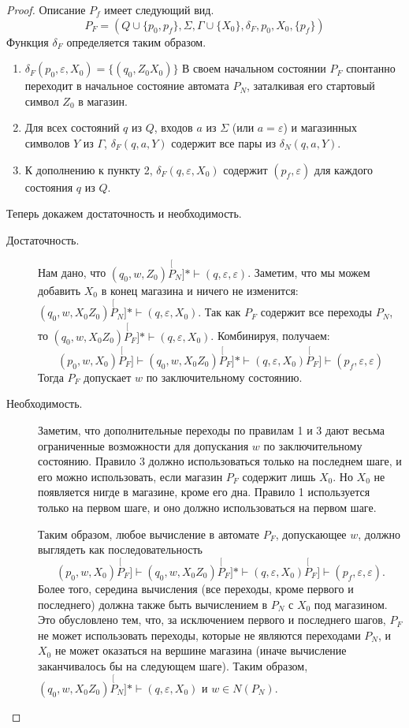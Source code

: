 \documentclass[a4paper,12pt]{article}
\begin{document}
\begin{proof}
	Описание \(P_f\) имеет следующий вид.
	\[P_F = \left(Q \cup \{p_0, p_f\}, \Sigma, \Gamma \cup \{X_0\}, \delta_F, p_0, X_0, \{p_f\}\right)\]
Функция \(\delta_F\) определяется таким образом.
\begin{enumerate}
	\item \(\delta_F(p_0, \varepsilon, X_0) = \{(q_0, Z_0X_0)\}\) В своем начальном состоянии \(P_F\) спонтанно переходит в
	начальное состояние автомата \(P_N\), заталкивая его стартовый символ \(Z_0\) в магазин.
	\item Для всех состояний \(q\) из \(Q\), входов \(a\) из \(\Sigma\) (или \(a = \varepsilon\)) и магазинных символов \(Y\) из \(\Gamma\), \(\delta_F(q, a, Y)\) содержит все пары из \(\delta_N(q, a, Y)\).
	\item К дополнению к пункту 2, \(\delta_F(q, \varepsilon, X_0)\) содержит \((p_f, \varepsilon)\) для каждого состояния \(q\) из \(Q\).
\end{enumerate}
Теперь докажем достаточность и необходимость.
\begin{description}
	\item[Достаточность.] Нам дано, что \((q_0, w, Z_0) \stackrel[P_N]{*}{\vdash} (q, \varepsilon, \varepsilon)\). Заметим, что мы можем добавить \(X_0\) в конец магазина и ничего не изменится: \((q_0, w, X_0Z_0) \stackrel[P_N]{*}{\vdash} (q, \varepsilon, X_0)\). Так как \(P_F\) содержит все переходы \(P_N\), то \((q_0, w, X_0Z_0) \stackrel[P_F]{*}{\vdash} (q, \varepsilon, X_0)\). Комбинируя, получаем:
	\[(p_0, w, X_0) \stackrel[P_F]{}{\vdash} (q_0, w, X_0Z_0)  \stackrel[P_F]{*}{\vdash} (q, \varepsilon, X_0) \stackrel[P_F]{}{\vdash} (p_f, \varepsilon, \varepsilon)\]
	Тогда \(P_F\) допускает \(w\) по заключительному состоянию.
	
	\item[Необходимость.] Заметим, что дополнительные переходы по правилам 1 и 3 дают весьма ограниченные возможности для допускания \(w\) по заключительному состоянию. Правило 3 должно использоваться только на последнем шаге, и его можно использовать, если магазин \(P_F\) содержит лишь \(X_0\). Но \(X_0\) не появляется нигде в магазине, кроме его дна. Правило 1 используется только на первом шаге, и оно должно использоваться на первом шаге.

	Таким образом, любое вычисление в автомате \(P_F\), допускающее \(w\), должно выглядеть как последовательность \[(p_0, w, X_0) \stackrel[P_F]{}{\vdash} (q_0, w, X_0Z_0)  \stackrel[P_F]{*}{\vdash} (q, \varepsilon, X_0) \stackrel[P_F]{}{\vdash} (p_f, \varepsilon, \varepsilon).\] 
	Более того, середина вычисления (все переходы, кроме первого и последнего) должна также быть вычислением в \(P_N\) с \(X_0\) под магазином. Это обусловлено тем, что, за исключением первого и последнего шагов, \(P_F\) не может использовать переходы, которые не являются переходами \(P_N\), и \(X_0\) не может оказаться на вершине магазина (иначе вычисление заканчивалось бы на следующем шаге). Таким образом, \((q_0, w, X_0Z_0) \stackrel[P_N]{*}{\vdash} (q, \varepsilon, X_0)\) и \(w \in N(P_N)\).
\end{description}
\end{proof}
\end{document}
